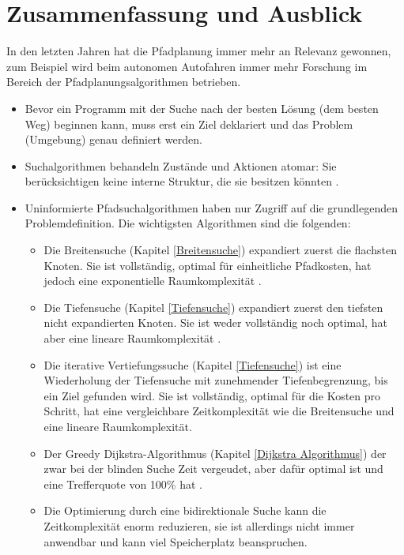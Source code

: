 \chapter{Zusammenfassung und Ausblick}
\label{Zusammenfassung und Ausblick}
In den letzten Jahren hat die Pfadplanung immer mehr an Relevanz gewonnen, zum Beispiel wird beim autonomen Autofahren immer mehr Forschung 
im Bereich der Pfadplanungsalgorithmen betrieben. \cite{Karur:21}
\noindent \\
\begin{itemize}
    \item Bevor ein Programm mit der Suche nach der besten Lösung (dem besten Weg) beginnen kann, muss erst ein Ziel deklariert und das Problem (Umgebung) genau definiert werden.
    \item Suchalgorithmen behandeln Zustände und Aktionen atomar: Sie berücksichtigen keine interne Struktur, die sie besitzen könnten \cite[108,109]{Russell:10}.
    \item Uninformierte Pfadsuchalgorithmen haben nur Zugriff auf die grundlegenden Problemdefinition. Die wichtigsten Algorithmen sind die folgenden:
    \begin{itemize}
        \item Die Breitensuche (Kapitel \ref{Breitensuche}) expandiert zuerst die flachsten Knoten. Sie ist vollständig, optimal für einheitliche Pfadkosten, hat jedoch eine exponentielle Raumkomplexität \cite[81]{Russell:10}.
        \item Die Tiefensuche (Kapitel \ref{Tiefensuche}) expandiert zuerst den tiefsten nicht expandierten Knoten. Sie ist weder vollständig noch optimal, hat aber eine lineare Raumkomplexität \cite[85,86]{Russell:10}.
        \item Die iterative Vertiefungssuche (Kapitel \ref{Tiefensuche}) ist eine Wiederholung der Tiefensuche mit zunehmender Tiefenbegrenzung, bis ein Ziel gefunden wird. Sie ist vollständig, optimal für die Kosten pro Schritt, hat eine vergleichbare Zeitkomplexität wie die Breitensuche und eine lineare Raumkomplexität\cite[85,86]{Russell:10}.
        \item Der Greedy Dijkstra-Algorithmus (Kapitel \ref{Dijkstra Algorithmus}) der zwar bei der blinden Suche Zeit vergeudet, aber dafür optimal ist und eine Trefferquote von 100\% hat \cite{Karur:21}.
        \item Die Optimierung durch eine bidirektionale Suche kann die Zeitkomplexität enorm reduzieren, sie ist allerdings nicht immer anwendbar und kann viel Speicherplatz beanspruchen.\\\\

\end{itemize}
\end{itemize}
